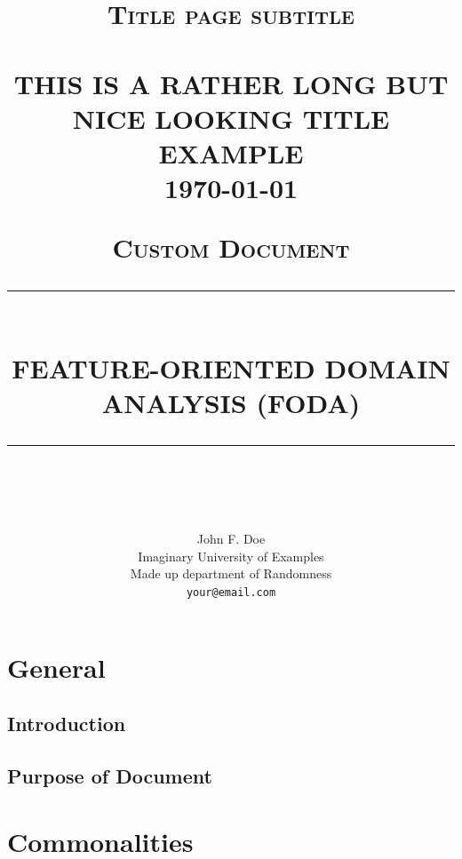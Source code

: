 \documentclass[12pt, titlepage] {article}
\title{	\normalsize \textsc{Title page subtitle} 	%
		 	\\[2.0cm]								%
			\HRule{0.5pt} \\						%
			\LARGE \textbf{\uppercase{This is a rather long but nice looking title example}}	%
			\HRule{2pt} \\ [0.5cm]		%
			\normalsize \today			%
		}
\author{
		John F. Doe\\	
		Imaginary University of Examples\\	
		Made up department of Randomness\\
        \texttt{your@email.com} \\
}
\newcommand{\HRule}[1]{\rule{\linewidth}{#1}} 	%
\begin{document}
\title{	\normalsize \textsc{Custom Document} 	%
    \\[2.0cm]								%
    \HRule{0.5pt} \\						%
    \LARGE \textbf{\uppercase{Feature-Oriented Domain Analysis (FODA)}}	%
    \HRule{2pt} \\ [0.5cm]		%
}
\author{\authname}
\thispagestyle{empty}		%


\maketitle


\tableofcontents
\listoftables

\setcounter{page}{1}		%

\newpage{}




\newpage{}
\setcounter{page}{1}		%
\section{General}
\subsection{Introduction}
\cite{SRS}
\subsection{Purpose of Document}


\newpage{}
\section{Commonalities}
\end{document}
